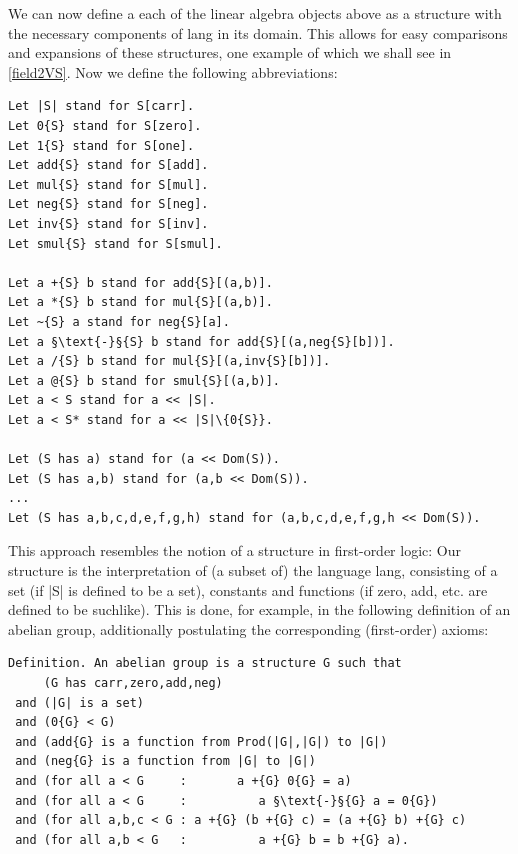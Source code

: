 \documentclass[11pt]{article}
\begin{document}
We can now define a each of the linear algebra objects above as a structure with the necessary components of {\ftl lang} in its domain. This allows for easy comparisons and expansions of these structures, one example of which we shall see in \ref{field2VS}. Now we define the following abbreviations:
\begin{lstlisting}
Let |S| stand for S[carr].
Let 0{S} stand for S[zero].
Let 1{S} stand for S[one].
Let add{S} stand for S[add].
Let mul{S} stand for S[mul].
Let neg{S} stand for S[neg].
Let inv{S} stand for S[inv].
Let smul{S} stand for S[smul].

Let a +{S} b stand for add{S}[(a,b)].
Let a *{S} b stand for mul{S}[(a,b)].
Let ~{S} a stand for neg{S}[a].
Let a §\text{-}§{S} b stand for add{S}[(a,neg{S}[b])].
Let a /{S} b stand for mul{S}[(a,inv{S}[b])].
Let a @{S} b stand for smul{S}[(a,b)].
Let a < S stand for a << |S|.
Let a < S* stand for a << |S|\{0{S}}.

Let (S has a) stand for (a << Dom(S)).
Let (S has a,b) stand for (a,b << Dom(S)).
...
Let (S has a,b,c,d,e,f,g,h) stand for (a,b,c,d,e,f,g,h << Dom(S)).
\end{lstlisting}

This approach resembles the notion of a structure in first-order logic: Our {\ftl structure} is the interpretation of (a subset of) the language {\ftl lang}, consisting of a set (if {\ftl |S|} is defined to be a set), constants and functions (if {\ftl zero}, {\ftl add}, etc. are defined to be suchlike).
This is done, for example, in the following definition of an abelian group, additionally postulating the corresponding (first-order) axioms:
\begin{lstlisting}
Definition. An abelian group is a structure G such that
     (G has carr,zero,add,neg)
 and (|G| is a set)
 and (0{G} < G)
 and (add{G} is a function from Prod(|G|,|G|) to |G|)
 and (neg{G} is a function from |G| to |G|)
 and (for all a < G     :       a +{G} 0{G} = a)
 and (for all a < G     :          a §\text{-}§{G} a = 0{G})
 and (for all a,b,c < G : a +{G} (b +{G} c) = (a +{G} b) +{G} c)
 and (for all a,b < G   :          a +{G} b = b +{G} a). 
\end{lstlisting}
\end{document}
